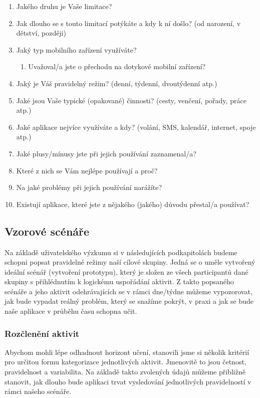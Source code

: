 \documentclass[thesis=M,czech]{FITthesis}[2012/06/26]
\begin{document}
\begin{enumerate}
\item Jakého druhu je Vaše limitace?
\item Jak dlouho se s touto limitací potýkáte a kdy k ní došlo? (od narození, v dětství, později)
\item Jaký typ mobilního zařízení využíváte?
\begin{enumerate}
\item Uvažoval/a jste o přechodu na dotykové mobilní zařízení?
\end{enumerate}
\item Jaký je Váš pravidelný režim? (denní, týdenní, dvoutýdenní atp.)
\item Jaké jsou Vaše typické (opakované) činnosti? (cesty, venčení, pořady, práce atp.)
\item Jaké aplikace nejvíce využíváte a kdy? (volání, SMS, kalendář, internet, spoje atp.)
\item Jaké plusy/mínusy jste při jejich používání zaznamenal/a?
\item Které z nich se Vám nejlépe používají a proč?
\item Na jaké problémy při jejich používání narážíte?
\item Existují aplikace, které jste z nějakého (jakého) důvodu přestal/a používat?
\end{enumerate}

\subsection{Vzorové scénáře}
Na základě uživatelského výzkumu si v následujících podkapitolách budeme schopni popsat pravidelné režimy naší cílové skupiny. Jedná se o uměle vytvořený ideální scénář (vytvoření prototypu), který je složen ze všech participantů dané skupiny s přihlédnutím k logickému uspořádání aktivit. Z takto popsaného scénáře a jeho aktivit odehrávajících se v rámci dne/týdne můžeme vypozorovat, jak bude vypadat reálný problém, který se snažíme pokrýt, v praxi a jak se bude naše aplikace v průběhu času schopna učit.

\subsubsection*{Rozčlenění aktivit}
Abychom mohli lépe odhadnout horizont učení, stanovili jsme si několik kritérií pro určitou formu kategorizace jednotlivých aktivit. Jmenovitě to jsou četnost, pravidelnost a variabilita. Na základě takto zvolených údajů můžeme přibližně stanovit, jak dlouho bude aplikaci trvat vysledování jednotlivých pravidelností v rámci našeho scénáře.
\end{document}
